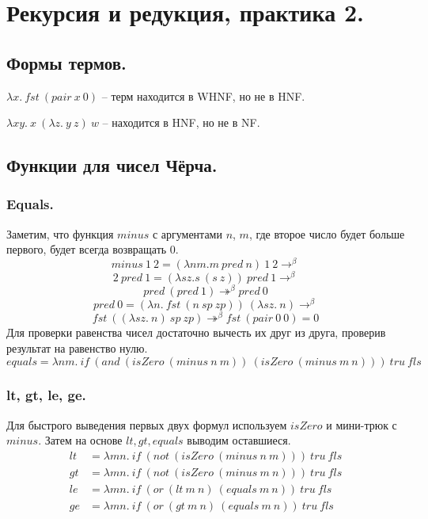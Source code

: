 \documentclass[a4paper,12pt]{article}
\author{Алексей Косенко}
\date{ВШЭ ПМИ, 2022 г.}
\theoremstyle{plain} %
\theoremstyle{definition} %
\theoremstyle{remark} %
\begin{document}
\maketitle

\section{Рекурсия и редукция, практика 2.}

\subsection{Формы термов.}

$\lambda x. \ fst \ (pair \ x \ 0)$ -- терм находится в WHNF, но не в HNF.

$\lambda xy. \ x \ (\lambda z. \ y \ z) \ w$ -- находится в HNF, но не в NF.
\subsection{Функции для чисел Чёрча.}
\subsubsection{Equals.}
Заметим, что функция $minus$ с аргументами $n$, $m$, где второе число будет больше первого, будет всегда возвращать $0$.
$$minus \ 1 \ 2 = (\lambda n m. m \ pred \ n) \ 1 \ 2 \rightarrow^{\beta}$$
$$2 \ pred \ 1 = (\lambda sz. s \ (s \ z)) \ pred \ 1 \rightarrow^{\beta}$$
$$pred \ (pred \ 1) \twoheadrightarrow^{\beta} pred \ 0$$
$$pred \ 0 = (\lambda n. \ fst \ (n \ sp \ zp)) \ (\lambda sz. \ n) \rightarrow^{\beta}$$
$$fst \ ((\lambda sz. \ n) \ sp \ zp) \twoheadrightarrow^{\beta} fst \ (pair \ 0 \ 0) = 0$$
Для проверки равенства чисел достаточно вычесть их друг из друга, проверив результат на равенство нулю.
$$equals = \lambda n m. \ if \ (and \ (isZero \ (minus \ n \ m)) \ (isZero \ (minus \ m \ n))) \ tru \ fls$$

\subsubsection{lt, gt, le, ge.}
Для быстрого выведения первых двух формул используем $isZero$ и мини-трюк с $minus$. Затем на основе $lt, gt, equals$ выводим оставшиеся. 
\begin{align*}
lt &= \lambda m n. \ if \ (not \ (isZero \ (minus \ n \ m))) \ tru \ fls \\
gt &= \lambda m n. \ if \ (not \ (isZero \ (minus \ m \ n))) \ tru \ fls \\
le &= \lambda m n. \ if \ (or \ (lt \ m \ n) \ (equals \ m \ n)) \ tru \ fls \\
ge &= \lambda m n. \ if \ (or \ (gt \ m \ n) \ (equals \ m \ n)) \ tru \ fls
\end{align*}
\end{document}
